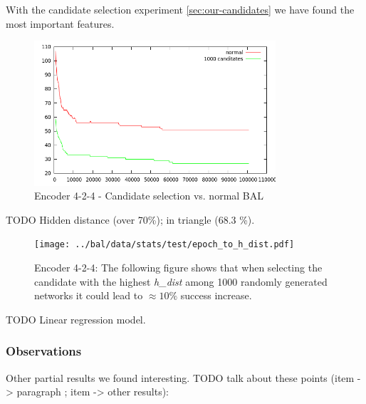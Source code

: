 With the candidate selection experiment \ref{sec:our-candidates} we have found the most important features. 

\begin{figure}[h]
  \centering
  \includegraphics[width=0.8\textwidth]{../presentation/img/long_run_error.png}    
  \caption{Encoder 4-2-4 - Candidate selection vs. normal BAL}
  \label{fig:TODO-4}
\end{figure}

TODO Hidden distance (over 70\%); in triangle (68.3 \%). 

\begin{figure}[h]
  \centering
  \texttt{[image: ../bal/data/stats/test/epoch\_to\_h\_dist.pdf]}    
  \caption{Encoder 4-2-4: The following figure shows that when selecting the candidate with the highest \emph{h\_dist} among 1000 randomly generated networks it could lead to $\approx 10\%$ success increase. }
  \label{fig:TODO-2}
\end{figure}


TODO Linear regression model. 

\subsubsection{Observations}
\label{sec:results-two-lambdas}  %

Other partial results we found interesting. 
TODO talk about these points (item -> paragraph ; item -> other results): 

